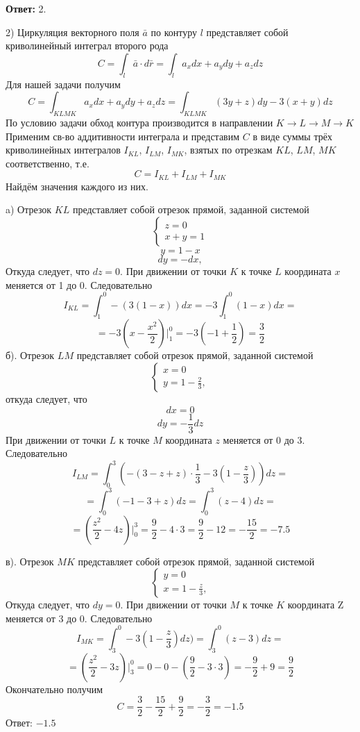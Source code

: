 \documentclass[11pt]{article}
\begin{document}
\textbf{Ответ:} 2.

2) Циркуляция векторного поля $\bar{a}$ по контуру $l$ представляет собой криволинейный интеграл второго рода
$$C=\int_l \bar{a}\cdot d\bar{r}=\int_{l}a_xdx+a_ydy+a_zdz$$
Для нашей задачи получим $$ C = \int_{KLMK} a_xdx + a_ydy + a_zdz = \int_{KLMK} (3y + z)dy - 3(x + y)dz$$
 По условию задачи обход контура производится в направлении $K \rightarrow L \rightarrow M \rightarrow K$ \\
Применим св-во аддитивности интеграла и представим $C$ в виде суммы трёх криволинейных интегралов $I_{KL}$, $I_{LM}$, $I_{MK}$, взятых по отрезкам $KL$, $LM$, $MK$ соответственно, т.е. $$ C = I_{KL} + I_{LM} + I_{MK}$$ Найдём значения каждого из них.

a) Отрезок $KL$ представляет собой отрезок прямой, заданной системой 
\[
 \begin{cases}
    z = 0     \\
    x + y = 1
  \end{cases}
\] 
$$y = 1 - x$$ $$dy = -dx,$$
Откуда следует, что $dz=0$. При движении от точки $K$ к точке $L$ координата $x$ меняется от 1 до 0. Следовательно  \[I_{KL}=\int_1^0 -(3(1 - x))dx = -3\int_1^0 (1 - x)dx = \]
\[= -3(x - \frac{x^2}{2})\Bigg|_1^0 = -3(-1 + \frac{1}{2})=\frac{3}{2}\]
б). Отрезок $LM$ представляет собой отрезок прямой, заданной системой \[
\begin{cases}
	x = 0 \\
	y = 1- \frac{2}{3},
\end{cases}
\]
откуда следует, что $$dx = 0$$ \[dy = - \frac{1}{3}dz\]
При движении от точки $L$ к точке $M$ координата $z$ меняется от 0  до 3. Следовательно \[
I_{LM} = \int_0^3 (-(3 - z + z) \cdot \frac{1}{3} - 3(1 - \frac{z}{3}))dz = 
\]
\[= \int_0^3 (-1 - 3 + z)dz = \int_0^3 (z - 4)dz = \]
\[= (\frac{z^2}{2} -  4z)\Bigg|_0^3 = \frac{9}{2} - 4\cdot 3 = \frac{9}{2} - 12 = -\frac{15}{2} = -7.5\]

в). Отрезок $MK$ представляет собой отрезок прямой, заданной системой \[
\begin{cases}
	y = 0 \\
	x = 1 - \frac{z}{3} \text{,}
\end{cases}
\]
Откуда следует, что $dy = 0$. При движении от точки $M$ к точке $K$ координата Z меняется от 3 до 0. Следовательно 
\[I_{MK} = \int_3^0 -3(1 - \frac{z}{3})dz) = \int_3^0 (z - 3)dz =\]
\[ = (\frac{z^2}{2} - 3z)\Bigg|_3^0 = 0 - 0 - (\frac{9}{2} - 3\cdot 3) = - \frac{9}{2} + 9 = \frac{9}{2}\]
Окончательно получим \[ C = \frac{3}{2} - \frac{15}{2} + \frac{9}{2} = -\frac{3}{2} = -1.5\]
Ответ: $-1.5$
\\
\\
\end{document}
